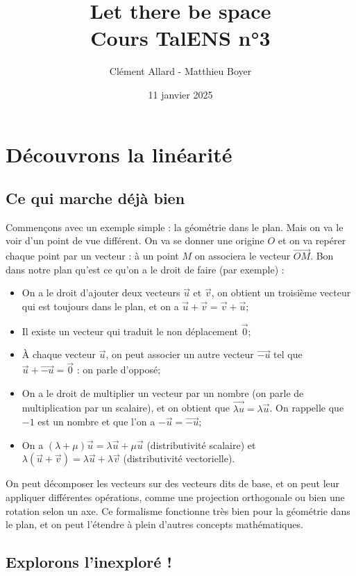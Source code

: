 \documentclass{classe}
\title{Let there be space\\ \small Cours TalENS n°3}
\author{Clément Allard - Matthieu Boyer}
\date{11 janvier 2025}
\begin{document}
\section{Découvrons la linéarité}

\subsection{Ce qui marche déjà bien}

Commençons avec un exemple simple : la géométrie dans le plan. Mais on va le voir d'un point de vue différent. On va se donner une origine $O$ et on va repérer chaque point par un vecteur : à un point $M$ on associera le vecteur $\overrightarrow{OM}$. Bon dans notre plan qu'est ce qu'on a le droit de faire (par exemple) :

\begin{itemize}
	\item On a le droit d'ajouter deux vecteurs $\vec{u}$ et $\vec{v}$, on obtient un troisième vecteur qui est toujours dans le plan, et on a $\vec{u} + \vec{v} = \vec{v} + \vec{u}$;
	\item Il existe un vecteur qui traduit le non déplacement $\vec{0}$;
	\item À chaque vecteur $\vec{u}$, on peut associer un autre vecteur $\overrightarrow{-u}$ tel que $\vec{u} + \overrightarrow{-u} = \vec{0}$ : on parle d'opposé;
	\item On a le droit de multiplier un vecteur par un nombre (on parle de multiplication par un scalaire), et on obtient que $\overrightarrow{\lambda u} = \lambda \vec{u}$. On rappelle que $-1$ est un nombre et que l'on a $-\vec{u} = \overrightarrow{-u}$;
	\item On a $(\lambda + \mu)\vec{u} = \lambda\vec{u} + \mu\vec{u}$ (distributivité scalaire) et $\lambda(\vec{u}+\vec{v}) = \lambda\vec{u}+\lambda\vec{v}$ (distributivité vectorielle).
\end{itemize}

On peut décomposer les vecteurs sur des vecteurs dits de base, et on peut leur appliquer différentes opérations, comme une projection orthogonale ou bien une rotation selon un axe. Ce formalisme fonctionne très bien pour la géométrie dans le plan, et on peut l'étendre à plein d'autres concepts mathématiques.

\subsection{Explorons l'inexploré !}
\end{document}
